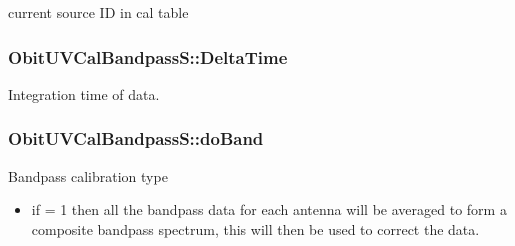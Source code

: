 current source ID in cal table 

\subsubsection{ {\bf Obit\-UVCal\-Bandpass\-S::Delta\-Time}}\label{structObitUVCalBandpassS_o24}


Integration time of data. 

\subsubsection{ {\bf Obit\-UVCal\-Bandpass\-S::do\-Band}}\label{structObitUVCalBandpassS_o21}


Bandpass calibration type \begin{itemize}
\item if = 1 then all the bandpass data for each antenna will be averaged to form a composite bandpass spectrum, this will then be used to correct the data. \end{itemize}


